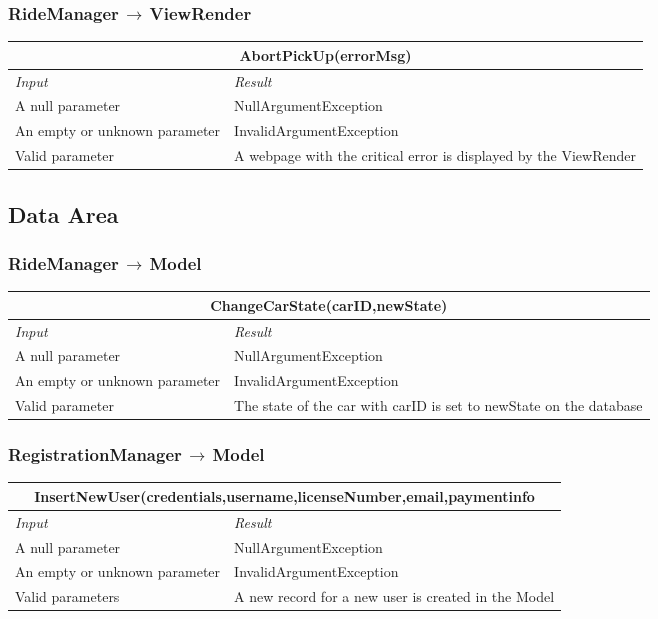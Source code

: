 \documentclass[11pt,a4paper]{report}
\begin{document}
\subsubsection{RideManager$\,\to\,$ViewRender}
\begin{tabularx}{\textwidth}{|X|X|}
	\hline
	\multicolumn{2}{|c|}{\textbf{AbortPickUp(errorMsg)}}\\
	\hline
	\textit{Input} & \textit{Result}\\
	\hline
	A null parameter & NullArgumentException\\
	\hline
	An empty or unknown parameter & InvalidArgumentException\\
	\hline
	Valid parameter & A webpage with the critical error is displayed by the ViewRender\\
	\hline
\end{tabularx}
\subsection{Data Area}
\subsubsection{RideManager$\,\to\,$Model}
\begin{tabularx}{\textwidth}{|X|X|}
	\hline
	\multicolumn{2}{|c|}{\textbf{ChangeCarState(carID,newState)}}\\
	\hline
	\textit{Input} & \textit{Result}\\
	\hline
	A null parameter & NullArgumentException\\
	\hline
	An empty or unknown parameter & InvalidArgumentException\\
	\hline
	Valid parameter & The state of the car with carID is set to newState on the database\\
	\hline
\end{tabularx}
\subsubsection{RegistrationManager$\,\to\,$Model}
\begin{tabularx}{\textwidth}{|X|X|}
	\hline
	\multicolumn{2}{|c|}{\textbf{InsertNewUser(credentials,username,licenseNumber,email,paymentinfo}}\\
	\hline
	\textit{Input} & \textit{Result}\\
	\hline
	A null parameter & NullArgumentException\\
	\hline
	An empty or unknown parameter & InvalidArgumentException\\
	\hline
	Valid parameters & A new record for a new user is created in the Model\\
	\hline
\end{tabularx}
\end{document}
